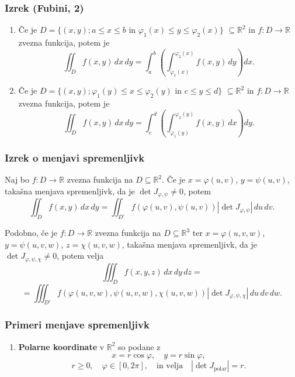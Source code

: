 \documentclass{article}
\begin{document}
\begin{multicols}{2}
	\subsubsection{Izrek (Fubini, 2)}
	\begin{enumerate}
		\item Če je \( D = \{(x,y); a \leq x \leq b \text{ in } \varphi_1(x) \leq y \leq \varphi_2(x)\} \) \( \subseteq \mathbb{R}^2 \) in \( f: D \rightarrow \mathbb{R} \) zvezna funkcija, potem je
		      \[
			      \iint_D f(x,y) \,dx\,dy = \int_a^b \left( \int_{\varphi_1(x)}^{\varphi_2(x)} f(x,y) \,dy \right) dx.
		      \]

		\item Če je \( D = \{(x,y); \varphi_1(y) \leq x \leq \varphi_2(y) \text{ in } c \leq y \leq d\} \) \( \subseteq \mathbb{R}^2 \) in \( f: D \rightarrow \mathbb{R} \) zvezna funkcija, potem je
		      \[
			      \iint_D f(x,y) \,dx\,dy = \int_c^d \left( \int_{\varphi_1(y)}^{\varphi_2(y)} f(x,y) \,dx \right) dy.
		      \]
	\end{enumerate}

	\subsubsection{Izrek o menjavi spremenljivk}
	Naj bo \( f: D \rightarrow \mathbb{R} \) zvezna funkcija na \( D \subseteq \mathbb{R}^2 \). Če je \( x = \varphi(u, v) \), \( y = \psi(u, v) \), takašna menjava spremenljivk, da je \( \det J_{\varphi,\psi} \neq 0 \), potem
	\[
		\iint_D f(x, y) \,dx\,dy = \iint_{D'} f(\varphi(u, v), \psi(u, v)) \left| \det J_{\varphi,\psi} \right| \,du\,dv.
	\]

	Podobno, če je \( f: D \rightarrow \mathbb{R} \) zvezna funkcija na \( D \subseteq \mathbb{R}^3 \) ter \( x = \varphi(u, v, w) \), \( y = \psi(u, v, w) \), \( z = \chi(u, v, w) \), takašna menjava spremenljivk, da je \( \det J_{\varphi,\psi,\chi} \neq 0 \), potem velja
	\[
		\iiint_D f(x, y, z) \,dx\,dy\,dz =
	\]
	\[
		= \iiint_{D'} f(\varphi(u, v, w), \psi(u, v, w), \chi(u, v, w)) \left| \det J_{\varphi,\psi,\chi} \right| \,du\,dv\,dw.
	\]

	\subsubsection{Primeri menjave spremenljivk}

	\begin{enumerate}
		\item \textbf{Polarne koordinate} v \( \mathbb{R}^2 \) so podane z
		      \[
			      x = r \cos \varphi, \quad y = r \sin \varphi,
		      \]
		      \[
			      r \geq 0, \quad \varphi \in [0, 2\pi], \quad \text{in velja} \quad |\det J_{\text{polar}}| = r.
		      \]


\end{enumerate}
\end{multicols}
\end{document}
